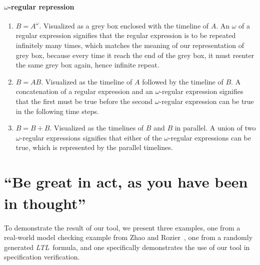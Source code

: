 \documentclass[conference]{IEEEtran}
\theoremstyle{definition}
\theoremstyle{remark}
\newcommand{\ltl}{\textit{LTL}}
\begin{document}
\paragraph{$\omega$-regular repression}
\begin{enumerate}
  \item $B = A^\omega$. Visualized as a grey box enclosed with the timeline of $A$. An $\omega$ of a regular expression signifies that the regular expression is to be repeated infinitely many times, which matches the meaning of our representation of grey box, because every time it reach the end of the grey box, it must reenter the same grey box again, hence infinite repeat.
  \item $B = AB$. Visualized as the timeline of $A$ followed by the timeline of $B$. A concatenation of a regular expression and an $\omega$-regular expression signifies that the first must be true before the second $\omega$-regular expression can be true in the following time steps.
  \item $B = B + B$. Visualized as the timelines of $B$ and $B$ in parallel. A union of two $\omega$-regular expressions signifies that either of the $\omega$-regular expressions can be true, which is represented by the parallel timelines.
\end{enumerate}

\section{``Be great in act, as you have been in thought\textsuperscript{\textsection}''}
\label{sec:tool-showcase}
\begingroup\renewcommand\thefootnote{\textsection}
\endgroup
To demonstrate the result of our tool, we present three examples, one from a real-world model checking example from Zhao and Rozier~\cite{ZR14}, one from a randomly generated \ltl\ formula, and one specifically demonstrates the use of our tool in specification verification.
\end{document}
